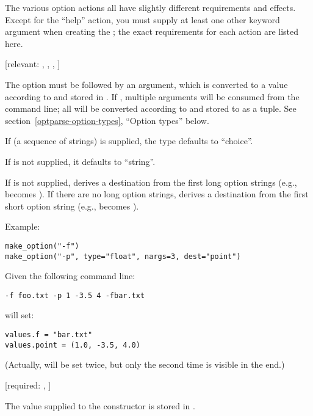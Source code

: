 The various option actions all have slightly different requirements
and effects.  Except for the ``help'' action, you must supply at least
one other keyword argument when creating the ; the exact
requirements for each action are listed here.

\begin{definitions}
 [relevant: , , , ]

The option must be followed by an argument, which is converted to a
value according to  and stored in .  If
, multiple arguments will be consumed from the command
line; all will be converted according to  and stored to
 as a tuple.  See section~\ref{optparse-option-types},
``Option types'' below.

If  (a sequence of strings) is supplied, the type
defaults to ``choice''.

If  is not supplied, it defaults to ``string''.

If  is not supplied,  derives a
destination from the first long option strings (e.g.,
 becomes ).  If there are no long
option strings,  derives a destination from the first
short option string (e.g.,  becomes ).

Example:

\begin{verbatim}
make_option("-f")
make_option("-p", type="float", nargs=3, dest="point")
\end{verbatim}

Given the following command line:

\begin{verbatim}
-f foo.txt -p 1 -3.5 4 -fbar.txt
\end{verbatim}

 will set:

\begin{verbatim}
values.f = "bar.txt"
values.point = (1.0, -3.5, 4.0)
\end{verbatim}

(Actually,  will be set twice, but only the second
time is visible in the end.)

 [required: , ]

The  value supplied to the  constructor is
stored in .


\end{definitions}
